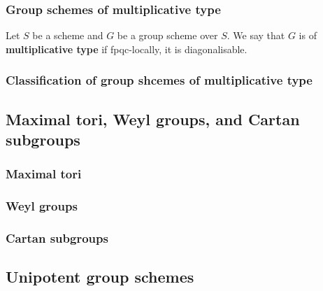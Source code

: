        \subsubsection{Group schemes of multiplicative type}
            \begin{definition} \label{def: group_schemes_of_multiplicative_type}
                Let $S$ be a scheme and $G$ be a group scheme over $S$. We say that $G$ is of \textbf{multiplicative type} if fpqc-locally, it is diagonalisable.     
            \end{definition}
            
        \subsubsection{Classification of group shcemes of multiplicative type}
        
    \subsection{Maximal tori, Weyl groups, and Cartan subgroups}
        \subsubsection{Maximal tori}
        
        \subsubsection{Weyl groups}
        
        \subsubsection{Cartan subgroups}
                
    \subsection{Unipotent group schemes}